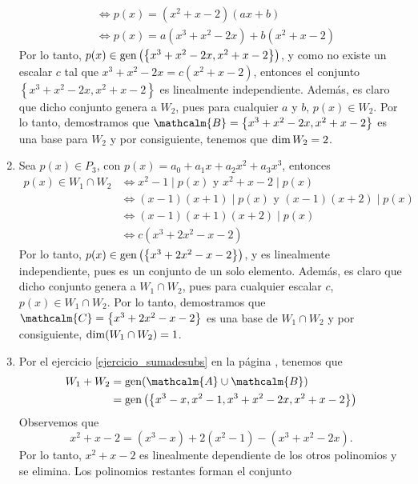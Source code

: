 \begin{examplebox}{}{}
\begin{enumerate}[label=\alph*), topsep=6pt, itemsep=0pt]
\begin{align*}
            & \Longleftrightarrow p(x) = \left( x^2 + x - 2 \right) (ax + b) \\
            & \Longleftrightarrow p(x) = a\left( x^3 + x^2 - 2x \right) + b\left( x^2 + x - 2 \right)
        \end{align*}
        Por lo tanto, $p(x) \in \operatorname{gen} \left(\left\{ x^3 + x^2 - 2x, x^2 + x - 2 \right\}\right)$, y como no existe un escalar $c$ tal que $x^3 + x^2 - 2x = c \left( x^2 + x - 2 \right)$, entonces el conjunto $\left\{ x^3 + x^2 - 2x, x^2 + x - 2 \right\}$ es linealmente independiente. Además, es claro que dicho conjunto genera a $W_2$, pues para cualquier $a$ y $b$, $p(x) \in W_2$. Por lo tanto, demostramos que $\mathcalm{B} = \left\{ x^3 + x^2 - 2x, x^2 + x - 2 \right\}$ es una base para $W_2$ y por consiguiente, tenemos que $\operatorname{dim} W_2 = 2$.
        \item Sea $p(x) \in P_3$, con $p(x) = a_0 + a_1x + a_2x^2 + a_3x^3$, entonces
        \begin{align*}
            p(x) \in W_1 \cap W_2 & \Longleftrightarrow x^2 - 1 \mid p(x) \text{ y } x^2 + x - 2 \mid p(x) \\
            & \Longleftrightarrow (x - 1)(x + 1) \mid p(x) \text{ y } (x - 1)(x + 2) \mid p(x) \\
            & \Longleftrightarrow (x - 1)(x + 1)(x + 2) \mid p(x) \\
            & \Longleftrightarrow c \left( x^3 + 2x^2 - x - 2 \right)
        \end{align*}
        Por lo tanto, $p(x) \in \operatorname{gen} \left(\left\{ x^3 + 2x^2 - x - 2 \right\}\right)$, y es linealmente independiente, pues es un conjunto de un solo elemento. Además, es claro que dicho conjunto genera a $W_1 \cap W_2$, pues para cualquier escalar $c$, $p(x) \in W_1 \cap W_2$. Por lo tanto, demostramos que $\mathcalm{C} = \left\{ x^3 + 2x^2 - x - 2 \right\}$ es una base de $W_1 \cap W_2$ y por consiguiente, $\operatorname{dim} (W_1 \cap W_2) = 1$.
        \item Por el ejercicio \ref{ejercicio_sumadesubs} en la página \pageref{ejercicio_sumadesubs}, tenemos que
        \begin{align*}
            W_1 + W_2 & = \Gen(\mathcalm{A} \cup \mathcalm{B}) \\
            & = \Gen \left(\left\{ x^3 - x, x^2 - 1, x^3 + x^2 - 2x, x^2 + x - 2 \right\}\right)
        \end{align*}
        Observemos que
        $$x^2 + x - 2 = \left( x^3 - x \right) + 2\left( x^2 - 1 \right) - \left( x^3 + x^2 - 2x \right).$$
        Por lo tanto, $x^2 + x - 2$ es linealmente dependiente de los otros polinomios y se elimina. Los polinomios restantes forman el conjunto

\end{enumerate}
\end{examplebox}
